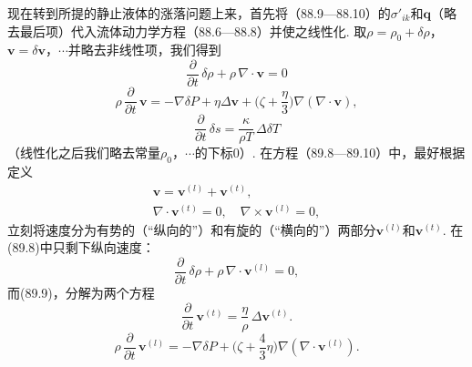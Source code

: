 现在转到所提的静止液体的涨落问题上来，首先将（88.9—88.10）的${\sigma'}_{ik}$和$\bm{q}$（略去最后项）代入流体动力学方程（88.6—88.8）并使之线性化. 取$\rho=\rho_{0}+\delta\rho$，$\bm{v}=\delta\bm{v}$，$\cdots$并略去非线性项，我们得到
\begin{equation}
\frac{\partial}{\partial t}\,\delta\rho+\rho\,\nabla\cdot\bm{v}=0
\end{equation}
\begin{equation}
\rho\,\frac{\partial}{\partial t}\,\bm{v}=-\nabla\delta P+\eta\Delta\bm{v}+\biggl(\zeta+\frac{\eta}{3}\biggr)\nabla(\nabla\cdot\bm{v}),
\end{equation}
\begin{equation}
\frac{\partial}{\partial t}\,\delta s=\frac{\kappa}{\rho T}\,\Delta\delta T
\end{equation}
（线性化之后我们略去常量$\rho_{0}$，$\cdots$的下标0）. 在方程（89.8—89.10）中，最好根据定义
\begin{equation}
\begin{gathered}
\bm{v}=\bm{v}^{(l)}+\bm{v}^{(t)},\\
\nabla\cdot\bm{v}^{(t)}=0,\quad\nabla\times\bm{v}^{(l)}=0,
\end{gathered}
\end{equation}
立刻将速度分为有势的（“纵向的”）和有旋的（“横向的”）两部分$\bm{v}^{(l)}$和$\bm{v}^{(t)}$. 在
(89.8)中只剩下纵向速度：
\begin{equation}
\frac{\partial}{\partial t}\,\delta\rho+\rho\,\nabla\cdot\bm{v}^{(l)}=0,
\end{equation}
而(89.9)，分解为两个方程
\begin{equation}
\frac{\partial}{\partial t}\,\bm{v}^{(t)}=\frac{\eta}{\rho}\,\Delta\bm{v}^{(t)}.
\end{equation}
\begin{equation}
\rho\,\frac{\partial}{\partial t}\,\bm{v}^{(l)}=-\nabla\delta P+\biggl(\zeta+\frac{4}{3}\eta\biggr)\nabla(\nabla\cdot\bm{v}^{(l)}).
\end{equation}

